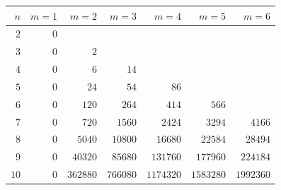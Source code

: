 \begin{tabular}{r|rrrrrr}
$n$ & $m=1$ & $m=2$ & $m=3$ & $m=4$ & $m=5$ & $m=6$ \\ \hline
$2$ & $0$ &  &  &  &  &  \\
$3$ & $0$ & $2$ &  &  &  &  \\
$4$ & $0$ & $6$ & $14$ &  &  &  \\
$5$ & $0$ & $24$ & $54$ & $86$ &  &  \\
$6$ & $0$ & $120$ & $264$ & $414$ & $566$ &  \\
$7$ & $0$ & $720$ & $1560$ & $2424$ & $3294$ & $4166$ \\
$8$ & $0$ & $5040$ & $10800$ & $16680$ & $22584$ & $28494$ \\
$9$ & $0$ & $40320$ & $85680$ & $131760$ & $177960$ & $224184$ \\
$10$ & $0$ & $362880$ & $766080$ & $1174320$ & $1583280$ & $1992360$ \\
\end{tabular}

